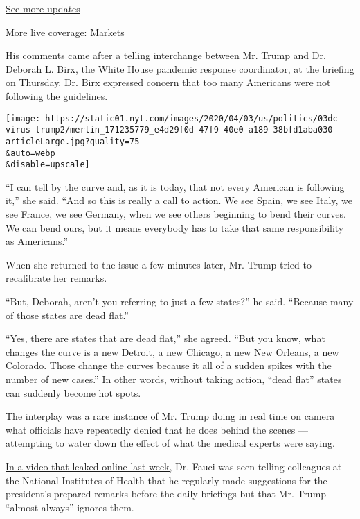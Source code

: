 \href{https://www.nytimes.com/2020/08/01/world/coronavirus-covid-19.html?action=click\&pgtype=Article\&state=default\&region=MAIN_CONTENT_1\&context=storylines_live_updates}{See
more updates}

More live coverage:
\href{https://www.nytimes.com/live/2020/07/31/business/stock-market-today-coronavirus?action=click\&pgtype=Article\&state=default\&region=MAIN_CONTENT_1\&context=storylines_live_updates}{Markets}

His comments came after a telling interchange between Mr. Trump and Dr.
Deborah L. Birx, the White House pandemic response coordinator, at the
briefing on Thursday. Dr. Birx expressed concern that too many Americans
were not following the guidelines.

\texttt{[image: https://static01.nyt.com/images/2020/04/03/us/politics/03dc-virus-trump2/merlin\_171235779\_e4d29f0d-47f9-40e0-a189-38bfd1aba030-articleLarge.jpg?quality=75\\\&auto=webp\\\&disable=upscale]}

``I can tell by the curve and, as it is today, that not every American
is following it,'' she said. ``And so this is really a call to action.
We see Spain, we see Italy, we see France, we see Germany, when we see
others beginning to bend their curves. We can bend ours, but it means
everybody has to take that same responsibility as Americans.''

When she returned to the issue a few minutes later, Mr. Trump tried to
recalibrate her remarks.

``But, Deborah, aren't you referring to just a few states?'' he said.
``Because many of those states are dead flat.''

``Yes, there are states that are dead flat,'' she agreed. ``But you
know, what changes the curve is a new Detroit, a new Chicago, a new New
Orleans, a new Colorado. Those change the curves because it all of a
sudden spikes with the number of new cases.'' In other words, without
taking action, ``dead flat'' states can suddenly become hot spots.

The interplay was a rare instance of Mr. Trump doing in real time on
camera what officials have repeatedly denied that he does behind the
scenes --- attempting to water down the effect of what the medical
experts were saying.

\href{https://abcnews.go.com/Politics/candid-talk-dr-fauci-future-restrictions-white-house/story?id=69901189}{In
a video that leaked online last week,} Dr. Fauci was seen telling
colleagues at the National Institutes of Health that he regularly made
suggestions for the president's prepared remarks before the daily
briefings but that Mr. Trump ``almost always'' ignores them.

